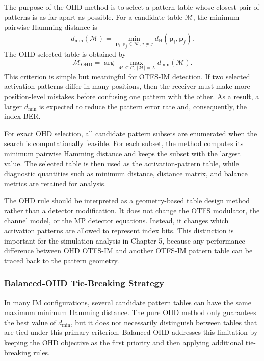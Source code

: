 The purpose of the OHD method is to select a pattern table whose closest pair of patterns is as far apart as possible. For a candidate table \(\mathcal{M}\), the minimum pairwise Hamming distance is
\begin{equation}
    d_{\min}(\mathcal{M})
    =
    \min_{\mathbf{p}_i,\mathbf{p}_j \in \mathcal{M},\, i\neq j}
    d_{\mathrm{H}}(\mathbf{p}_i,\mathbf{p}_j).
    \label{eq:pattern_minimum_hamming_distance}
\end{equation}
The OHD-selected table is obtained by
\begin{equation}
    \mathcal{M}_{\mathrm{OHD}}
    =
    \arg\max_{\mathcal{M}\subseteq\mathcal{C},\,|\mathcal{M}|=L}
    d_{\min}(\mathcal{M}).
    \label{eq:ohd_selection_rule}
\end{equation}
This criterion is simple but meaningful for OTFS-IM detection. If two selected activation patterns differ in many positions, then the receiver must make more position-level mistakes before confusing one pattern with the other. As a result, a larger \(d_{\min}\) is expected to reduce the pattern error rate and, consequently, the index BER.

For exact OHD selection, all candidate pattern subsets are enumerated when the search is computationally feasible. For each subset, the method computes its minimum pairwise Hamming distance and keeps the subset with the largest value. The selected table is then used as the activation-pattern table, while diagnostic quantities such as minimum distance, distance matrix, and balance metrics are retained for analysis.

The OHD rule should be interpreted as a geometry-based table design method rather than a detector modification. It does not change the OTFS modulator, the channel model, or the MP detector equations. Instead, it changes which activation patterns are allowed to represent index bits. This distinction is important for the simulation analysis in Chapter 5, because any performance difference between OHD OTFS-IM and another OTFS-IM pattern table can be traced back to the pattern geometry.

\subsubsection{Balanced-OHD Tie-Breaking Strategy}

In many IM configurations, several candidate pattern tables can have the same maximum minimum Hamming distance. The pure OHD method only guarantees the best value of \(d_{\min}\), but it does not necessarily distinguish between tables that are tied under this primary criterion. Balanced-OHD addresses this limitation by keeping the OHD objective as the first priority and then applying additional tie-breaking rules.


